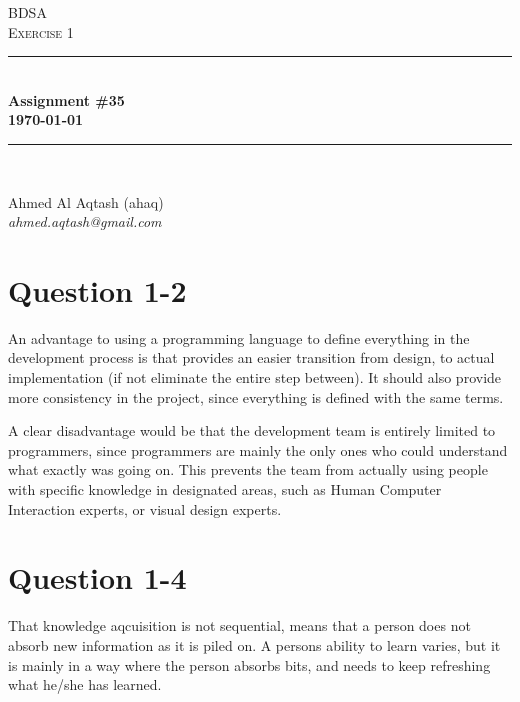 \documentclass[10pt]{report}
\numberwithin{equation}{section} %
\numberwithin{figure}{section} %
\numberwithin{table}{section} %
\newcommand{\HRule}{\rule{\linewidth}{0.5mm}}
\begin{document}
\begin{titlepage}

\begin{center}

\textsc{\LARGE BDSA}\\[1.5cm]

\textsc{\Large Exercise 1}\\[0.5cm]

\HRule \\[0.4cm]

{ \bfseries Assignment \#35 \\[0.5cm] 
    {\small \today}} \\[0.7cm]

\HRule \\ [6.5cm]

\begin{minipage}{0.5\textwidth}
\begin{flushleft} \large
Ahmed Al Aqtash (ahaq)\\
\textit{ahmed.aqtash@gmail.com}\\
[0.2cm]

\vfill 
\end{flushleft}
\end{minipage}



\end{center}

\end{titlepage}
\clearpage

\section{Question 1-2}
An advantage to using a programming language to define everything in the
development process is that provides an easier transition from design, to
actual implementation (if not eliminate the entire step between). It should
also provide more consistency in the project, since everything is defined with
the same terms.

A clear disadvantage would be that the development team is entirely limited to
programmers, since programmers are mainly the only ones who could understand
what exactly was going on. This prevents the team from actually using people 
with specific knowledge in designated areas, such as Human Computer 
Interaction experts, or visual design experts.

\section{Question 1-4}
That knowledge aqcuisition is not sequential, means that a person does not
absorb new information as it is piled on. A persons ability to learn varies,
but it is mainly in a way where the person absorbs bits, and needs
to keep refreshing what he/she has learned.
\end{document}
